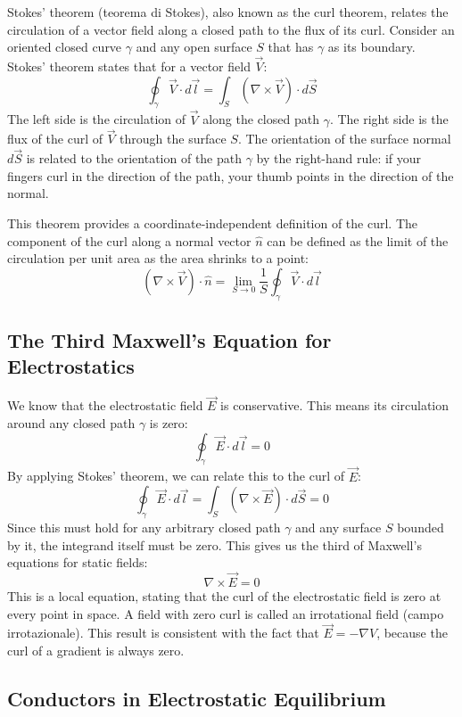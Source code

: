 Stokes' theorem (teorema di Stokes), also known as the curl theorem, relates the circulation of a vector field along a closed path to the flux of its curl.
Consider an oriented closed curve \(\gamma\) and any open surface \(S\) that has \(\gamma\) as its boundary. Stokes' theorem states that for a vector field \(\vec{V}\):
\[ \oint_\gamma \vec{V} \cdot d\vec{l} = \int_S (\nabla \times \vec{V}) \cdot d\vec{S} \]
The left side is the circulation of \(\vec{V}\) along the closed path \(\gamma\). The right side is the flux of the curl of \(\vec{V}\) through the surface \(S\). The orientation of the surface normal \(d\vec{S}\) is related to the orientation of the path \(\gamma\) by the right-hand rule: if your fingers curl in the direction of the path, your thumb points in the direction of the normal.

This theorem provides a coordinate-independent definition of the curl. The component of the curl along a normal vector \(\hat{n}\) can be defined as the limit of the circulation per unit area as the area shrinks to a point:
\[ (\nabla \times \vec{V}) \cdot \hat{n} = \lim_{S \to 0} \frac{1}{S} \oint_\gamma \vec{V} \cdot d\vec{l} \]

\subsection*{The Third Maxwell's Equation for Electrostatics}

We know that the electrostatic field \(\vec{E}\) is conservative. This means its circulation around any closed path \(\gamma\) is zero:
\[ \oint_\gamma \vec{E} \cdot d\vec{l} = 0 \]
By applying Stokes' theorem, we can relate this to the curl of \(\vec{E}\):
\[ \oint_\gamma \vec{E} \cdot d\vec{l} = \int_S (\nabla \times \vec{E}) \cdot d\vec{S} = 0 \]
Since this must hold for any arbitrary closed path \(\gamma\) and any surface \(S\) bounded by it, the integrand itself must be zero. This gives us the third of Maxwell's equations for static fields:
\[ \nabla \times \vec{E} = 0 \]
This is a local equation, stating that the curl of the electrostatic field is zero at every point in space. A field with zero curl is called an irrotational field (campo irrotazionale). This result is consistent with the fact that \(\vec{E} = -\nabla V\), because the curl of a gradient is always zero.

\subsection*{Conductors in Electrostatic Equilibrium}

